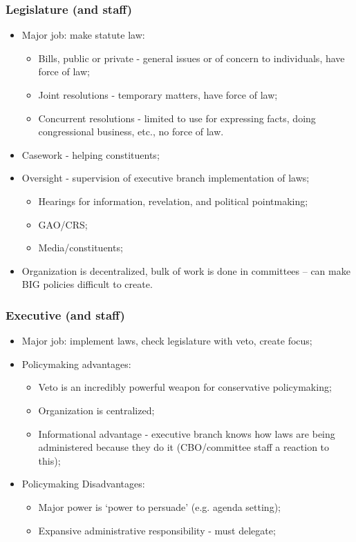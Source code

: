 \documentclass[aspectratio=169]{beamer}
\theoremstyle{principle}
\begin{document}
\begin{frame}
\frametitle{Legislature (and staff)}
\begin{itemize}
\item Major job: make statute law:
\begin{itemize}
\item Bills, public or private - general issues or of concern to individuals, have force of law;
\item Joint resolutions - temporary matters, have force of law;
\item Concurrent resolutions - limited to use for expressing facts, doing congressional business, etc., no force of law.
\end{itemize}
\bigskip
\item Casework - helping constituents;
\bigskip
\item Oversight - supervision of executive branch implementation of laws;
\begin{itemize}
\item Hearings for information, revelation, and political pointmaking;
\item GAO/CRS;
\item Media/constituents;
\end{itemize}
\bigskip
\item Organization is decentralized, bulk of work is done in committees -- can make BIG policies difficult to create.
\end{itemize}
\end{frame}

\begin{frame}
\frametitle{Executive (and staff)}
\begin{itemize}
\item Major job: implement laws, check legislature with veto, create focus;
\bigskip
\item Policymaking advantages:
\begin{itemize}
\item Veto is an incredibly powerful weapon for conservative policymaking;
\item Organization is centralized;
\item Informational advantage - executive branch knows how laws are being administered because they do it (CBO/committee staff a reaction to this);
\end{itemize}
\bigskip
\item Policymaking Disadvantages:
\begin{itemize}
\item Major power is `power to persuade' (e.g. agenda setting);
\item Expansive administrative responsibility - must delegate;
\end{itemize}
\end{itemize}
\end{frame}
\end{document}
